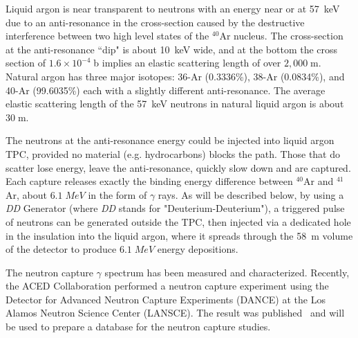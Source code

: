 
Liquid argon is near transparent to neutrons with an energy near or at 57~keV due to an anti-resonance in the cross-section caused by the destructive interference between two high level states of the $^{40}$Ar nucleus. The cross-section at the anti-resonance ``dip" is about 10~keV wide, and at the bottom the cross section of $1.6\times 10^{-4}\;$b implies an elastic scattering length of over $2,000\;$m. %
Natural argon has three major isotopes: 36-Ar (0.3336\%), 38-Ar (0.0834\%), and 40-Ar (99.6035\%) each with a slightly different anti-resonance. The average elastic scattering length of the 57~keV neutrons in natural liquid argon is about $30\;$m.

The neutrons at the anti-resonance energy could be injected into liquid argon TPC, provided no material (e.g. hydrocarbons) blocks the path. Those that do scatter lose energy, leave the anti-resonance, quickly slow down and are captured. Each capture releases exactly the binding energy difference between $^{40}$Ar and $^{41}$Ar, about $6.1\; MeV$ in the form of $\gamma$ rays.  As will be described below, by using a {\it DD} Generator (where {\it DD} stands for "Deuterium-Deuterium"), a triggered pulse of neutrons can be generated outside the TPC, then injected via a dedicated hole in the insulation into the liquid argon, where it spreads through the 58~m volume of the detector to produce $6.1\; MeV$ energy depositions.

The neutron capture $\gamma$ spectrum has been measured and characterized. Recently, the ACED Collaboration performed a neutron capture experiment using  the Detector  for Advanced  Neutron  Capture  Experiments  (DANCE)  at the  Los  Alamos  Neutron  Science  Center  (LANSCE). The result was published~\cite{aced} and will be used to prepare a database for the neutron capture studies.


